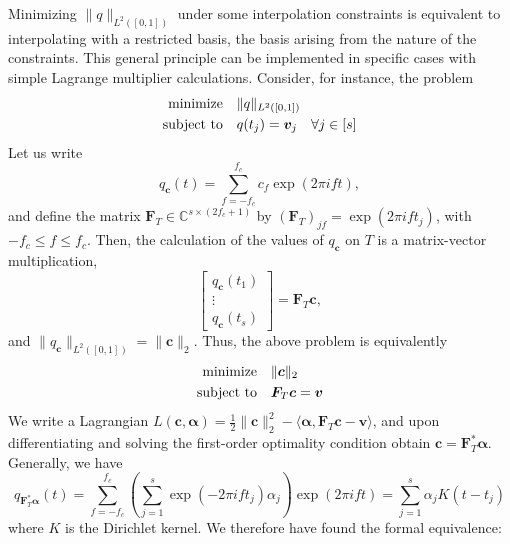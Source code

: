 \documentclass[11pt]{article}
\newcommand{\ra}{\rangle}
\newcommand{\la}{\langle}
\newcommand{\CC}{\mathbb{C}}
\newcommand{\HS}{\hspace{3.5mm}}
\newcommand{\balpha}{\bm \alpha}
\newcommand{\bF}{\bm F}
\newcommand{\bc}{\bm c}
\newcommand{\bv}{\bm v}
\begin{document}
Minimizing $\|q\|_{L^2([0, 1])}$ under some interpolation constraints is equivalent to interpolating with a restricted basis, the basis arising from the nature of the constraints.
This general principle can be implemented in specific cases with simple Lagrange multiplier calculations.
Consider, for instance, the problem
\begin{equation}
\begin{aligned}
  \text{minimize} &\HS \|q\|_{L^2([0, 1])} \\
  \text{subject to} &\HS q(t_j) = \bv_j \HS \forall j \in [s]
\end{aligned}
\end{equation}
Let us write
\begin{equation}
    q_{\bc}(t) = \sum_{f = -f_c}^{f_c} c_f \exp(2\pi i ft),
\end{equation}
and define the matrix $\bF_T \in \CC^{s \times (2f_c + 1)}$ by $(\bF_T)_{jf} = \exp(2\pi i ft_j)$, with $-f_c \leq f \leq f_c$.
Then, the calculation of the values of $q_{\bc}$ on $T$ is a matrix-vector multiplication,
\begin{equation}
    \left[\begin{array}{c} q_{\bc}(t_1) \\ \vdots \\ q_{\bc}(t_s) \end{array}\right] = \bF_T \bc,
\end{equation}
and $\|q_{\bc}\|_{L^2([0, 1])} = \|\bc\|_{2}$.
Thus, the above problem is equivalently
\begin{equation}
\begin{aligned}
  \text{minimize} &\HS \|\bc\|_{2} \\
  \text{subject to} &\HS \bF_T\bc = \bv
\end{aligned}
\end{equation}
We write a Lagrangian $L(\bc, \balpha) = \frac{1}{2}\|\bc\|_2^2 - \la \bm \alpha, \bF_T\bc - \bv \ra$, and upon differentiating and solving the first-order optimality condition obtain $\bc = \bF_T^*\bm \alpha$.
Generally, we have
\begin{equation}
    q_{\bF_T^* \bm \alpha}(t) = \sum_{f = -f_c}^{f_c} \left(\sum_{j = 1}^s \exp(-2\pi i ft_j)\alpha_j\right)\exp(2\pi i f t) = \sum_{j = 1}^s \alpha_jK(t - t_j)
\end{equation}
where $K$ is the Dirichlet kernel.
We therefore have found the formal equivalence:
\end{document}
